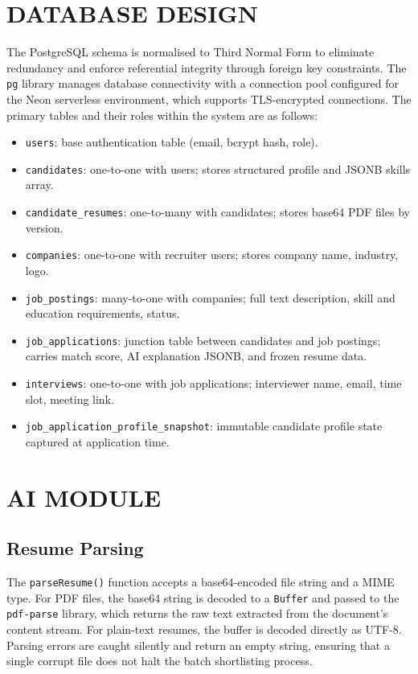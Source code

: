 \documentclass[12pt,a4paper]{report}
\begin{document}
\section{DATABASE DESIGN}

The PostgreSQL schema is normalised to Third Normal Form to eliminate redundancy and enforce referential integrity through foreign key constraints. The \texttt{pg} library manages database connectivity with a connection pool configured for the Neon serverless environment, which supports TLS-encrypted connections. The primary tables and their roles within the system are as follows:

\begin{itemize}[leftmargin=0.5in, topsep=4pt, itemsep=2pt]
    \item \texttt{users}: base authentication table (email, bcrypt hash, role).
    \item \texttt{candidates}: one-to-one with users; stores structured profile and JSONB skills array.
    \item \texttt{candidate\_resumes}: one-to-many with candidates; stores base64 PDF files by version.
    \item \texttt{companies}: one-to-one with recruiter users; stores company name, industry, logo.
    \item \texttt{job\_postings}: many-to-one with companies; full text description, skill and education requirements, status.
    \item \texttt{job\_applications}: junction table between candidates and job postings; carries match score, AI explanation JSONB, and frozen resume data.
    \item \texttt{interviews}: one-to-one with job applications; interviewer name, email, time slot, meeting link.
    \item \texttt{job\_application\_profile\_snapshot}: immutable candidate profile state captured at application time.
\end{itemize}

\section{AI MODULE}

\subsection{Resume Parsing}

The \texttt{parseResume()} function accepts a base64-encoded file string and a MIME type. For PDF files, the base64 string is decoded to a \texttt{Buffer} and passed to the \texttt{pdf-parse} library, which returns the raw text extracted from the document's content stream. For plain-text resumes, the buffer is decoded directly as UTF-8. Parsing errors are caught silently and return an empty string, ensuring that a single corrupt file does not halt the batch shortlisting process.
\end{document}
